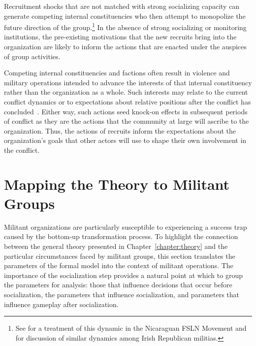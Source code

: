Recruitment shocks that are not matched with strong socializing capacity can generate competing internal constituencies who then attempt to monopolize the future direction of the group.\footnote{See \cite{mosinger2017dissident} for a treatment of this dynamic in the Nicaraguan FSLN Movement and \cite{perkoski2015organizational} for discussion of similar dynamics among Irish Republican militias.} In the absence of strong socializing or monitoring institutions, the pre-existing motivations that the new recruits bring into the organization are likely to inform the actions that are enacted under the auspices of group activities.

Competing internal constituencies and factions often  result in violence and military operations intended to advance the interests of that internal constituency rather than the organization as a whole. Such interests may relate to the current conflict dynamics or to expectations about relative positions after the conflict has concluded~\autocite{balcells2010rivalry}. Either way, such actions seed knock-on effects in subsequent periods of conflict as they are the actions that the community at large will ascribe to the organization. Thus, the actions of recruits inform the expectations about the organization's goals that other actors will use to shape their own involvement in the conflict. 

\section{Mapping the Theory to Militant Groups}

Militant organizations are particularly susceptible to experiencing a success trap caused by the bottom-up transformation process. To highlight the connection between the general theory presented in Chapter~\ref{chapter:theory} and the particular circumstances faced by militant groups, this section translates the parameters of the formal model into the context of militant operations. The importance of the socialization step provides a natural point at which to group the parameters for analysis:  those that influence decisions that occur before socialization, the parameters that influence socialization, and parameters that influence gameplay after socialization.  %


